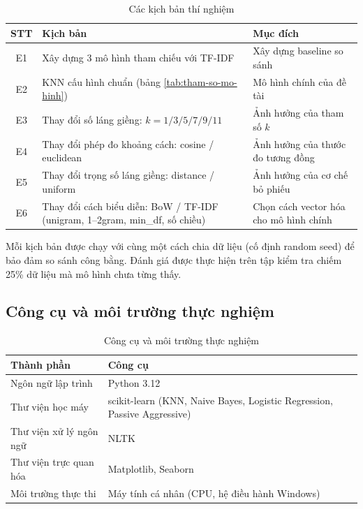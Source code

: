 \begin{table}[H]
\centering
\caption{Các kịch bản thí nghiệm}
\label{tab:kich-ban}
\begin{tabular}{|c|p{5.5cm}|p{5.5cm}|}
\hline
\textbf{STT} & \textbf{Kịch bản} & \textbf{Mục đích} \\
\hline
E1 & Xây dựng 3 mô hình tham chiếu với TF-IDF & Xây dựng baseline so sánh \\
\hline
E2 & KNN cấu hình chuẩn (bảng \ref{tab:tham-so-mo-hinh}) & Mô hình chính của đề tài \\
\hline
E3 & Thay đổi số láng giềng: $k = 1 / 3 / 5 / 7 / 9 / 11$ & Ảnh hưởng của tham số $k$ \\
\hline
E4 & Thay đổi phép đo khoảng cách: cosine / euclidean & Ảnh hưởng của thước đo tương đồng \\
\hline
E5 & Thay đổi trọng số láng giềng: distance / uniform & Ảnh hưởng của cơ chế bỏ phiếu \\
\hline
E6 & Thay đổi cách biểu diễn: BoW / TF-IDF (unigram, 1--2gram, min\_df, số chiều) & Chọn cách vector hóa cho mô hình chính \\
\hline
\end{tabular}
\end{table}

Mỗi kịch bản được chạy với cùng một cách chia dữ liệu (cố định random seed) để bảo đảm so sánh công bằng. Đánh giá được thực hiện trên tập kiểm tra chiếm 25\% dữ liệu mà mô hình chưa từng thấy.

\subsection{Công cụ và môi trường thực nghiệm}

\begin{table}[H]
\centering
\caption{Công cụ và môi trường thực nghiệm}
\label{tab:moi-truong}
\begin{tabular}{|l|l|}
\hline
\textbf{Thành phần} & \textbf{Công cụ} \\
\hline
Ngôn ngữ lập trình & Python 3.12 \\
\hline
Thư viện học máy & scikit-learn (KNN, Naive Bayes, Logistic Regression, Passive Aggressive) \\
\hline
Thư viện xử lý ngôn ngữ & NLTK \\
\hline
Thư viện trực quan hóa & Matplotlib, Seaborn \\
\hline
Môi trường thực thi & Máy tính cá nhân (CPU, hệ điều hành Windows) \\
\hline
\end{tabular}
\end{table}

